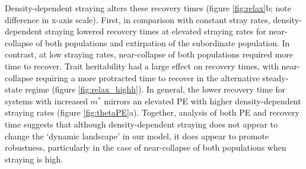 \documentclass{revtex4}
\begin{document}
Density-dependent straying alters these recovery times (figure \ref{fig:relax}b; note difference in x-axis scale). 
First, in comparison with constant stray rates, density-dependent straying lowered recovery times at elevated straying rates for near-collapse of both populations and extirpation of the subordinate population.
In contrast, at low straying rates, near-collapse of both populations required more time to recover. %
Trait heritability had a large effect on recovery times, with near-collapse requiring a more protracted time to recover in the alternative steady-state regime (figure \ref{fig:relax_highh}).
In general, the lower recovery time for systems with increased $m^*$ mirrors an elevated PE with higher density-dependent straying rates (figure \ref{fig:thetaPE}a).
Together, analysis of both PE and recovery time suggests that although density-dependent straying does not appear to change the `dynamic landscape' in our model, it does appear to promote robustness, particularly in the case of near-collapse of both populations when straying is high.
\\
\end{document}
